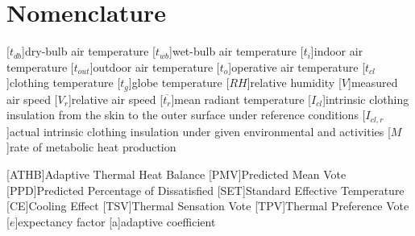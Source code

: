 
\section*{Nomenclature}
\renewcommand{\baselinestretch}{0.75}\normalsize
\renewcommand{\aclabelfont}[1]{\textsc{\acsfont{#1}}}
\begin{acronym}[longest]

    [$t_{db}$]{dry-bulb air temperature}
    [$t_{wb}$]{wet-bulb air temperature}
    [$t_{i}$]{indoor air temperature}
    [$t_{out}$]{outdoor air temperature}
    [$t_{o}$]{operative air temperature}
    [$t_{cl}$]{clothing temperature}
    [$t_{g}$]{globe temperature}
    [$RH$]{relative humidity\acroextra{, \%}}
    [$V$]{measured air speed}
    [$V_{r}$]{relative air speed}
    [$\overline{t_{r}}$]{mean radiant temperature}
    [$I_{cl}$]{intrinsic clothing insulation from the skin to the outer surface under reference conditions}
    [$I_{cl,r}$]{actual intrinsic clothing insulation under given environmental and activities}
    [$M$]{rate of metabolic heat production}

    [ATHB]{Adaptive Thermal Heat Balance}
    [PMV]{Predicted Mean Vote}
    [PPD]{Predicted Percentage of Dissatisfied\acroextra{, \%}}
    [SET]{Standard Effective Temperature}
    [CE]{Cooling Effect}
    [TSV]{Thermal Sensation Vote}
    [TPV]{Thermal Preference Vote}
    [$e$]{expectancy factor}
    [a]{adaptive coefficient}


\end{acronym}
